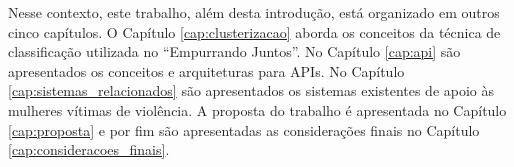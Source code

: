 
Nesse contexto, este trabalho, além desta introdução, está organizado em outros cinco capítulos. O Capítulo \ref{cap:clusterizacao} aborda os conceitos da técnica de 
classificação utilizada no ``Empurrando Juntos''. No Capítulo \ref{cap:api} são apresentados os conceitos e arquiteturas para APIs.
No Capítulo \ref{cap:sistemas_relacionados} são apresentados os sistemas existentes de apoio às mulheres vítimas de violência. A proposta do trabalho
é apresentada no Capítulo \ref{cap:proposta} e por fim são apresentadas as considerações finais no Capítulo \ref{cap:consideracoes_finais}.




